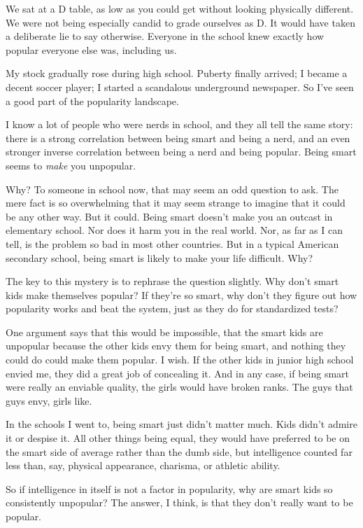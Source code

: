 \documentclass[12pt]{book}
\begin{document}
We sat at a D table, as low as you could get without looking physically
different. We were not being especially candid to grade ourselves as D.
It would have taken a deliberate lie to say otherwise. Everyone in the
school knew exactly how popular everyone else was, including us.

My stock gradually rose during high school. Puberty finally arrived; I
became a decent soccer player; I started a scandalous underground
newspaper. So I've seen a good part of the popularity landscape.

I know a lot of people who were nerds in school, and they all tell the
same story: there is a strong correlation between being smart and being
a nerd, and an even stronger inverse correlation between being a nerd
and being popular. Being smart seems to \emph{make} you unpopular.

Why? To someone in school now, that may seem an odd question to ask. The
mere fact is so overwhelming that it may seem strange to imagine that it
could be any other way. But it could. Being smart doesn't make you an
outcast in elementary school. Nor does it harm you in the real world.
Nor, as far as I can tell, is the problem so bad in most other
countries. But in a typical American secondary school, being smart is
likely to make your life difficult. Why?

The key to this mystery is to rephrase the question slightly. Why don't
smart kids make themselves popular? If they're so smart, why don't they
figure out how popularity works and beat the system, just as they do for
standardized tests?

One argument says that this would be impossible, that the smart kids are
unpopular because the other kids envy them for being smart, and nothing
they could do could make them popular. I wish. If the other kids in
junior high school envied me, they did a great job of concealing it. And
in any case, if being smart were really an enviable quality, the girls
would have broken ranks. The guys that guys envy, girls like.

In the schools I went to, being smart just didn't matter much. Kids
didn't admire it or despise it. All other things being equal, they would
have preferred to be on the smart side of average rather than the dumb
side, but intelligence counted far less than, say, physical appearance,
charisma, or athletic ability.

So if intelligence in itself is not a factor in popularity, why are
smart kids so consistently unpopular? The answer, I think, is that they
don't really want to be popular.
\end{document}
